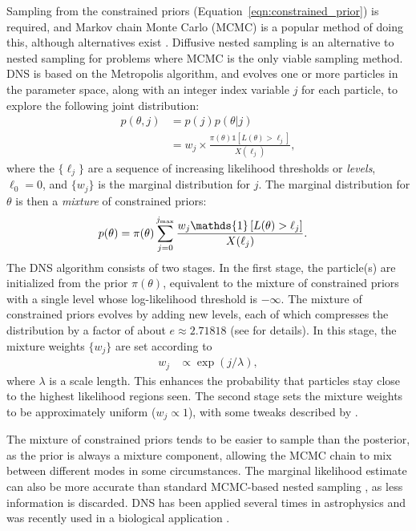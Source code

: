 \documentclass[article]{jss}
\begin{document}
Sampling from the constrained priors (Equation~\ref{eqn:constrained_prior})
is required, and Markov chain Monte Carlo (MCMC) is a popular method of doing
this, although alternatives exist
\citep[e.g.,][]{feroz2009multinest, handley2015polychord}.
Diffusive nested sampling \citep[DNS;][]{brewer2011diffusive}
is an alternative to nested sampling for
problems where MCMC is the only viable sampling method. DNS is based on the
Metropolis algorithm, and evolves one or more particles in the parameter space, along with
an integer index variable $j$ for each particle,
to explore the following joint distribution:
\begin{align}
p(\theta, j) &= p(j)p(\theta | j)\nonumber\\
&= w_j \times
\frac{\pi(\theta)\mathds{1}\left[L(\theta) > \ell_j\right]}{X(\ell_j)},
\label{eqn:target_distribution}
\end{align}
where the $\{\ell_j\}$ are a sequence of increasing likelihood thresholds
or {\em levels},
$\ell_0 = 0$, and $\{w_j\}$ is the marginal distribution for $j$.
The marginal distribution for $\theta$ is then a {\em mixture} of
constrained priors:
\begin{align}
p(\theta) &=
\pi(\theta)\sum_{j=0}^{j_{\rm max}}
\frac{w_j\mathds{1}\left[L(\theta) > \ell_j\right]}{X(\ell_j)}.
\label{eqn:mixture_of_constrained_priors}
\end{align}
The DNS algorithm consists of two stages. In the first stage,
the particle(s) are initialized from the prior $\pi(\theta)$, equivalent
to the mixture of constrained priors with a single level whose log-likelihood
threshold is $-\infty$. The mixture of constrained priors evolves by adding new levels,
each of which compresses the distribution by a factor of about $e \approx 2.71818$
(see \citet{brewer2011diffusive} for details). In this stage,
the mixture weights $\{w_j\}$ are set according to
\begin{align}
w_j &\propto \exp(j/\lambda),\label{eqn:weighting}
\end{align}
where $\lambda$ is a scale length.
This enhances the probability that particles stay close to the
highest likelihood regions seen.
The second stage sets the mixture weights to be approximately
uniform ($w_j \propto 1$), with some tweaks described by
\citet{brewer2011diffusive}.

The mixture of constrained priors tends to be easier to sample than the
posterior, as the prior is always a mixture component, allowing the
MCMC chain to mix between different modes in some circumstances. The marginal
likelihood estimate can also be more accurate than standard MCMC-based nested sampling
\citep{brewer2011diffusive}, as less information is discarded.
DNS has been applied several times in astrophysics
\citep[e.g.,][]{pancoast2014modelling, huppenkothen2015dissecting,
brewer2015fast}
and was recently used in a biological application
\citep{dybowski2015single}.
\end{document}
